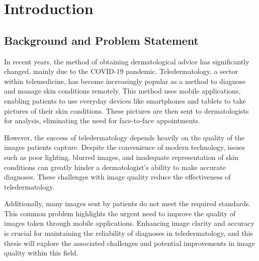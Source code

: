 \chapter{Introduction}
\label{ch:Introduction}

\section{Background and Problem Statement}
\label{sec:BackgroundProblemStatement}
In recent years, the method of obtaining dermatological advice has significantly changed, mainly due to the COVID-19 pandemic. Teledermatology, a sector within telemedicine, has become increasingly popular as a method to diagnose and manage skin conditions remotely. This method uses mobile applications, enabling patients to use everyday devices like smartphones and tablets to take pictures of their skin conditions. These pictures are then sent to dermatologists for analysis, eliminating the need for face-to-face appointments. \par
\vspace{\baselineskip}
However, the success of teledermatology depends heavily on the quality of the images patients capture. Despite the convenience of modern technology, issues such as poor lighting, blurred images, and inadequate representation of skin conditions can greatly hinder a dermatologist's ability to make accurate diagnoses. These challenges with image quality reduce the effectiveness of teledermatology. \par
\vspace{\baselineskip}
Additionally, many images sent by patients do not meet the required standards. This common problem highlights the urgent need to improve the quality of images taken through mobile applications. Enhancing image clarity and accuracy is crucial for maintaining the reliability of diagnoses in teledermatology, and this thesis will explore the associated challenges and potential improvements in image quality within this field.\par 


